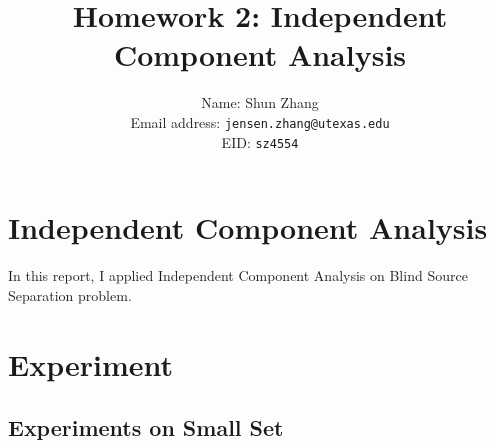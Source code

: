 \documentclass[10pt]{article}
\title{Homework 2: Independent Component Analysis}
\author{Name: Shun Zhang\\
Email address: \texttt{jensen.zhang@utexas.edu}\\
EID: \texttt{sz4554}}
\date{}
\begin{document}
\maketitle

\section{Independent Component Analysis}

In this report, I applied Independent Component Analysis on Blind Source
Separation problem.

\section{Experiment}

\subsection{Experiments on Small Set}
\end{document}
